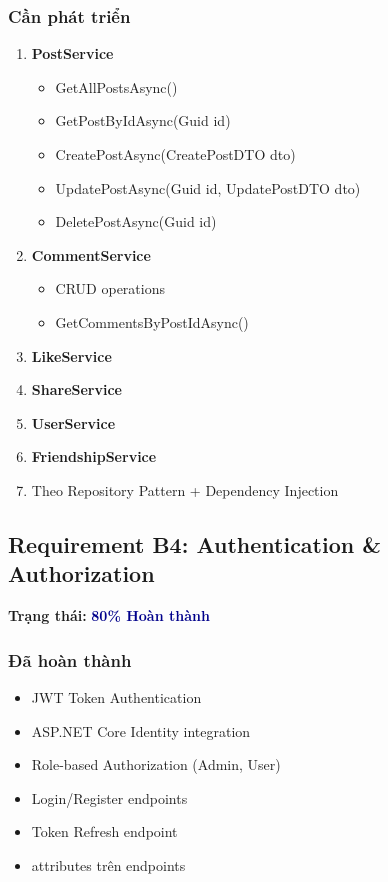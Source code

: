 \documentclass[12pt,a4paper]{report}
\begin{document}
\subsubsection{Cần phát triển}
\begin{enumerate}
    \item \textbf{PostService}
    \begin{itemize}
        \item GetAllPostsAsync()
        \item GetPostByIdAsync(Guid id)
        \item CreatePostAsync(CreatePostDTO dto)
        \item UpdatePostAsync(Guid id, UpdatePostDTO dto)
        \item DeletePostAsync(Guid id)
    \end{itemize}
    
    \item \textbf{CommentService}
    \begin{itemize}
        \item CRUD operations
        \item GetCommentsByPostIdAsync()
    \end{itemize}
    
    \item \textbf{LikeService}
    \item \textbf{ShareService}
    \item \textbf{UserService}
    \item \textbf{FriendshipService}
    \item Theo Repository Pattern + Dependency Injection
\end{enumerate}

\subsection{Requirement B4: Authentication \& Authorization}
\textbf{Trạng thái: } \textcolor{darkblue}{\textbf{80\% Hoàn thành}}

\subsubsection{Đã hoàn thành}
\begin{itemize}
    \item[$\checkmark$] JWT Token Authentication
    \item[$\checkmark$] ASP.NET Core Identity integration
    \item[$\checkmark$] Role-based Authorization (Admin, User)
    \item[$\checkmark$] Login/Register endpoints
    \item[$\checkmark$] Token Refresh endpoint
    \item[$\checkmark$] [Authorize] attributes trên endpoints
\end{itemize}
\end{document}
